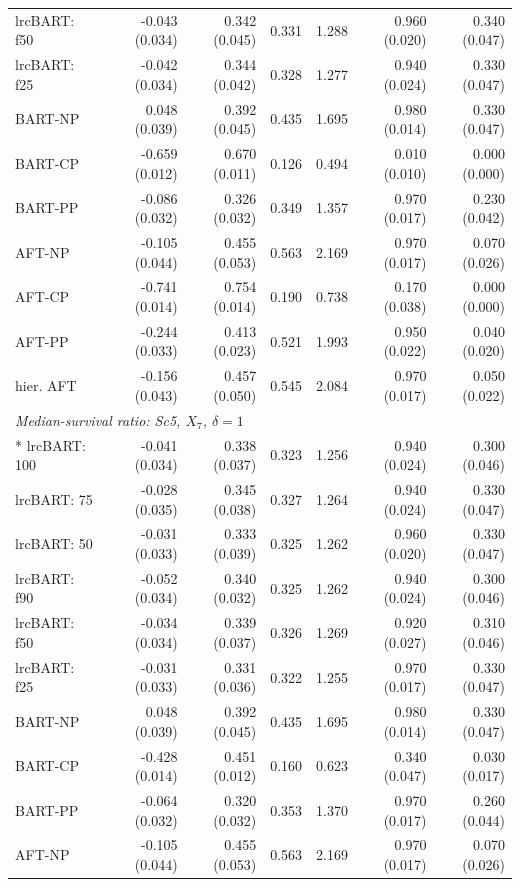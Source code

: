 \begin{landscape}
\begin{longtable}{lrrrrrr}
lrcBART: f50 & -0.043 (0.034) & 0.342 (0.045) & 0.331 & 1.288 & 0.960 (0.020) & 0.340 (0.047) \\
lrcBART: f25 & -0.042 (0.034) & 0.344 (0.042) & 0.328 & 1.277 & 0.940 (0.024) & 0.330 (0.047) \\
BART-NP & 0.048 (0.039) & 0.392 (0.045) & 0.435 & 1.695 & 0.980 (0.014) & 0.330 (0.047) \\
BART-CP & -0.659 (0.012) & 0.670 (0.011) & 0.126 & 0.494 & 0.010 (0.010) & 0.000 (0.000) \\
BART-PP & -0.086 (0.032) & 0.326 (0.032) & 0.349 & 1.357 & 0.970 (0.017) & 0.230 (0.042) \\
AFT-NP & -0.105 (0.044) & 0.455 (0.053) & 0.563 & 2.169 & 0.970 (0.017) & 0.070 (0.026) \\
AFT-CP & -0.741 (0.014) & 0.754 (0.014) & 0.190 & 0.738 & 0.170 (0.038) & 0.000 (0.000) \\
AFT-PP & -0.244 (0.033) & 0.413 (0.023) & 0.521 & 1.993 & 0.950 (0.022) & 0.040 (0.020) \\
hier. AFT & -0.156 (0.043) & 0.457 (0.050) & 0.545 & 2.084 & 0.970 (0.017) & 0.050 (0.022) \\
\multicolumn{7}{l}{\strut\textit{Median-survival ratio: Sc5, $X_7$, $\delta=1$}}\\*
lrcBART: 100 & -0.041 (0.034) & 0.338 (0.037) & 0.323 & 1.256 & 0.940 (0.024) & 0.300 (0.046) \\
lrcBART: 75 & -0.028 (0.035) & 0.345 (0.038) & 0.327 & 1.264 & 0.940 (0.024) & 0.330 (0.047) \\
lrcBART: 50 & -0.031 (0.033) & 0.333 (0.039) & 0.325 & 1.262 & 0.960 (0.020) & 0.330 (0.047) \\
lrcBART: f90 & -0.052 (0.034) & 0.340 (0.032) & 0.325 & 1.262 & 0.940 (0.024) & 0.300 (0.046) \\
lrcBART: f50 & -0.034 (0.034) & 0.339 (0.037) & 0.326 & 1.269 & 0.920 (0.027) & 0.310 (0.046) \\
lrcBART: f25 & -0.031 (0.033) & 0.331 (0.036) & 0.322 & 1.255 & 0.970 (0.017) & 0.330 (0.047) \\
BART-NP & 0.048 (0.039) & 0.392 (0.045) & 0.435 & 1.695 & 0.980 (0.014) & 0.330 (0.047) \\
BART-CP & -0.428 (0.014) & 0.451 (0.012) & 0.160 & 0.623 & 0.340 (0.047) & 0.030 (0.017) \\
BART-PP & -0.064 (0.032) & 0.320 (0.032) & 0.353 & 1.370 & 0.970 (0.017) & 0.260 (0.044) \\
AFT-NP & -0.105 (0.044) & 0.455 (0.053) & 0.563 & 2.169 & 0.970 (0.017) & 0.070 (0.026) \\

\end{longtable}
\end{landscape}
